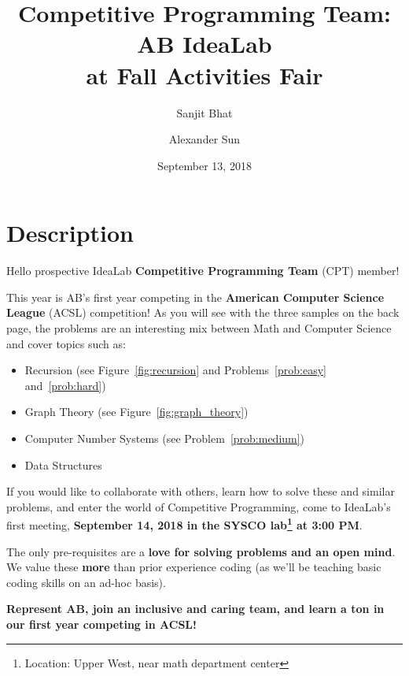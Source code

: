 \documentclass[12pt]{article}
\title{Competitive Programming Team: AB IdeaLab\\ at Fall Activities Fair}
\author{Sanjit Bhat \and Alexander Sun}
\date{September 13, 2018}
\begin{document}
\maketitle

\section{Description}
Hello prospective IdeaLab \textbf{Competitive Programming Team} (CPT) member!

This year is AB's first year competing in the \textbf{American Computer Science League} (ACSL) competition!
As you will see with the three samples on the back page, the
problems are an interesting mix between Math and Computer Science and cover topics such as:

\begin{itemize}
\item Recursion (see Figure~\ref{fig:recursion} and Problems~\ref{prob:easy} and~\ref{prob:hard})
\item Graph Theory (see Figure~\ref{fig:graph_theory})
\item Computer Number Systems (see Problem~\ref{prob:medium})
\item Data Structures
\end{itemize}

If you would like to collaborate with others, learn how to solve these and similar problems,
and enter the world of Competitive Programming, come to IdeaLab's first meeting,
\textbf{September 14, 2018 in the SYSCO lab\footnote{Location: Upper West, near math department center} at 3:00 PM}.

The only pre-requisites are a \textbf{love for solving problems and an open mind}.
We value these \textbf{more} than prior experience coding
(as we'll be teaching basic coding skills on an ad-hoc basis).

\textbf{Represent AB, join an inclusive and caring team, and learn a ton in our first year competing in ACSL!}
\end{document}
